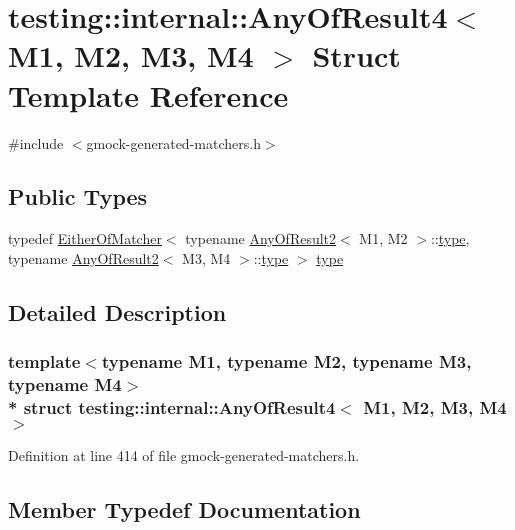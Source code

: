 \hypertarget{structtesting_1_1internal_1_1_any_of_result4}{}\section{testing\+:\+:internal\+:\+:Any\+Of\+Result4$<$ M1, M2, M3, M4 $>$ Struct Template Reference}
\label{structtesting_1_1internal_1_1_any_of_result4}


{\ttfamily \#include $<$gmock-\/generated-\/matchers.\+h$>$}

\subsection*{Public Types}
\begin{DoxyCompactItemize}
\item 
typedef \hyperlink{classtesting_1_1internal_1_1_either_of_matcher}{Either\+Of\+Matcher}$<$ typename \hyperlink{structtesting_1_1internal_1_1_any_of_result2}{Any\+Of\+Result2}$<$ M1, M2 $>$\+::\hyperlink{structtesting_1_1internal_1_1_any_of_result4_a4f3c9aebb4f7fc24287b59a0bdf1a4a6}{type}, typename \hyperlink{structtesting_1_1internal_1_1_any_of_result2}{Any\+Of\+Result2}$<$ M3, M4 $>$\+::\hyperlink{structtesting_1_1internal_1_1_any_of_result4_a4f3c9aebb4f7fc24287b59a0bdf1a4a6}{type} $>$ \hyperlink{structtesting_1_1internal_1_1_any_of_result4_a4f3c9aebb4f7fc24287b59a0bdf1a4a6}{type}
\end{DoxyCompactItemize}


\subsection{Detailed Description}
\subsubsection*{template$<$typename M1, typename M2, typename M3, typename M4$>$\\*
struct testing\+::internal\+::\+Any\+Of\+Result4$<$ M1, M2, M3, M4 $>$}



Definition at line 414 of file gmock-\/generated-\/matchers.\+h.



\subsection{Member Typedef Documentation}
